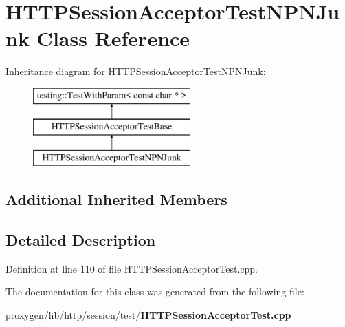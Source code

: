 \section{H\+T\+T\+P\+Session\+Acceptor\+Test\+N\+P\+N\+Junk Class Reference}
\label{classHTTPSessionAcceptorTestNPNJunk}
Inheritance diagram for H\+T\+T\+P\+Session\+Acceptor\+Test\+N\+P\+N\+Junk\+:\begin{figure}[H]
\begin{center}
\leavevmode
\includegraphics[height=3.000000cm]{classHTTPSessionAcceptorTestNPNJunk}
\end{center}
\end{figure}
\subsection*{Additional Inherited Members}


\subsection{Detailed Description}


Definition at line 110 of file H\+T\+T\+P\+Session\+Acceptor\+Test.\+cpp.



The documentation for this class was generated from the following file\+:\begin{DoxyCompactItemize}
\item 
proxygen/lib/http/session/test/{\bf H\+T\+T\+P\+Session\+Acceptor\+Test.\+cpp}\end{DoxyCompactItemize}
